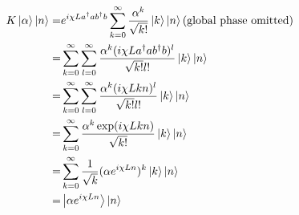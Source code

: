 \ex

\ex $$\begin{aligned}
    K\left|\alpha\right\rangle\left|n\right\rangle
    = & e^{i\chi La^\dagger ab^\dagger b}\sum_{k=0}^\infty \frac{\alpha^k}{\sqrt{k!}} \left|k\right\rangle \left|n\right\rangle(\text{global phase omitted})
    \\ = & \sum_{k=0}^\infty \sum_{l=0}^\infty \frac{\alpha^k(i\chi La^\dagger ab^\dagger b)^l}{\sqrt{k!}l!} \left|k\right\rangle \left|n\right\rangle
    \\ = & \sum_{k=0}^\infty \sum_{l=0}^\infty \frac{\alpha^k(i\chi Lkn)^l}{\sqrt{k!}l!} \left|k\right\rangle \left|n\right\rangle
    \\ = & \sum_{k=0}^\infty \frac{\alpha^k\exp(i\chi Lkn)}{\sqrt{k!}} \left|k\right\rangle \left|n\right\rangle
    \\ = & \sum_{k=0}^\infty \frac{1}{\sqrt{k}} (\alpha e^{i\chi Ln})^k \left|k\right\rangle \left|n\right\rangle
    \\ = & \left|\alpha e^{i\chi Ln}\right\rangle \left|n\right\rangle
\end{aligned}$$